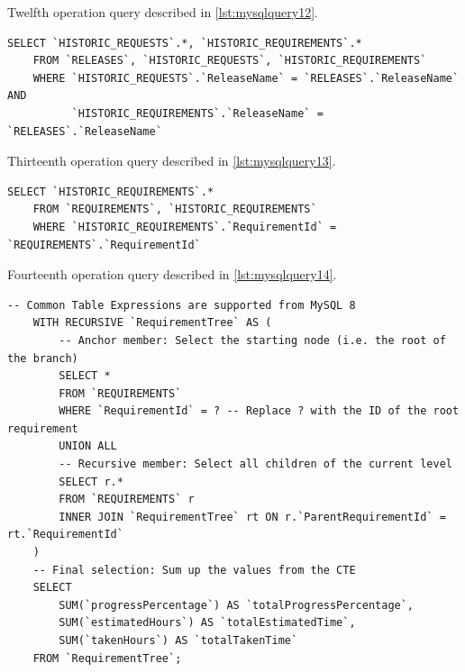 \documentclass[12pt, a4paper]{report}
\begin{document}
Twelfth operation query described in \autoref{lst:mysqlquery12}.

\begin{lstlisting}[language=MySQL, caption={op. 12}, label={lst:mysqlquery12}]
    SELECT `HISTORIC_REQUESTS`.*, `HISTORIC_REQUIREMENTS`.*
    FROM `RELEASES`, `HISTORIC_REQUESTS`, `HISTORIC_REQUIREMENTS`
    WHERE `HISTORIC_REQUESTS`.`ReleaseName` = `RELEASES`.`ReleaseName` AND
          `HISTORIC_REQUIREMENTS`.`ReleaseName` = `RELEASES`.`ReleaseName`
\end{lstlisting}

Thirteenth operation query described in \autoref{lst:mysqlquery13}.

\begin{lstlisting}[language=MySQL, caption={op. 13}, label={lst:mysqlquery13}]
    SELECT `HISTORIC_REQUIREMENTS`.*
    FROM `REQUIREMENTS`, `HISTORIC_REQUIREMENTS`
    WHERE `HISTORIC_REQUIREMENTS`.`RequirementId` = `REQUIREMENTS`.`RequirementId`
\end{lstlisting}

Fourteenth operation query described in \autoref{lst:mysqlquery14}.

\begin{lstlisting}[language=MySQL, caption={op. 14}, label={lst:mysqlquery14}]
    -- Common Table Expressions are supported from MySQL 8
    WITH RECURSIVE `RequirementTree` AS (
        -- Anchor member: Select the starting node (i.e. the root of the branch)
        SELECT *
        FROM `REQUIREMENTS`
        WHERE `RequirementId` = ? -- Replace ? with the ID of the root requirement
        UNION ALL
        -- Recursive member: Select all children of the current level
        SELECT r.*
        FROM `REQUIREMENTS` r
        INNER JOIN `RequirementTree` rt ON r.`ParentRequirementId` = rt.`RequirementId`
    )
    -- Final selection: Sum up the values from the CTE
    SELECT
        SUM(`progressPercentage`) AS `totalProgressPercentage`,
        SUM(`estimatedHours`) AS `totalEstimatedTime`,
        SUM(`takenHours`) AS `totalTakenTime`
    FROM `RequirementTree`;
\end{lstlisting}


\end{document}
